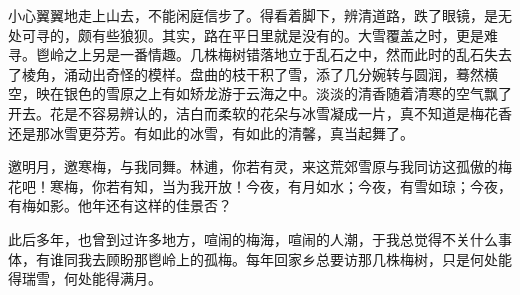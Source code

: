 小心翼翼地走上山去，不能闲庭信步了。得看着脚下，辨清道路，跌了眼镜，是无处可寻的，颇有些狼狈。其实，路在平日里就是没有的。大雪覆盖之时，更是难寻。鬯岭之上另是一番情趣。几株梅树错落地立于乱石之中，然而此时的乱石失去了棱角，涌动出奇怪的模样。盘曲的枝干积了雪，添了几分婉转与圆润，蓦然横空，映在银色的雪原之上有如矫龙游于云海之中。淡淡的清香随着清寒的空气飘了开去。花是不容易辨认的，洁白而柔软的花朵与冰雪凝成一片，真不知道是梅花香还是那冰雪更芬芳。有如此的冰雪，有如此的清馨，真当起舞了。

邀明月，邀寒梅，与我同舞。林逋，你若有灵，来这荒郊雪原与我同访这孤傲的梅花吧！寒梅，你若有知，当为我开放！今夜，有月如水；今夜，有雪如琼；今夜，有梅如影。他年还有这样的佳景否？

此后多年，也曾到过许多地方，喧闹的梅海，喧闹的人潮，于我总觉得不关什么事体，有谁同我去顾盼那鬯岭上的孤梅。每年回家乡总要访那几株梅树，只是何处能得瑞雪，何处能得满月。